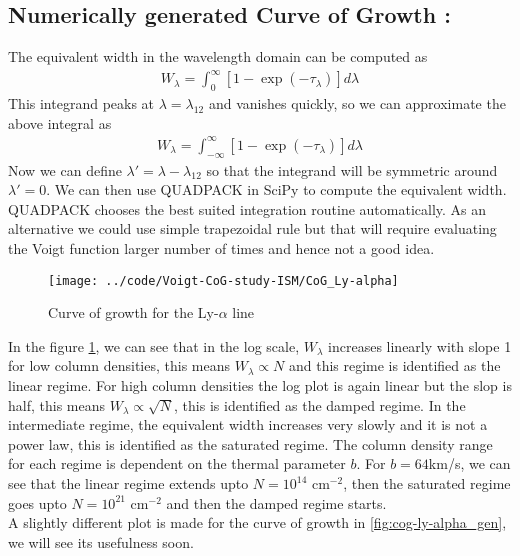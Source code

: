 \documentclass[12pt]{article}
\begin{document}

\subsection{Numerically generated Curve of Growth :}

The equivalent width in the wavelength domain can be computed as
\begin{align}
W_{\lambda} = \int_{0}^{\infty} [1 -\exp (-\tau_{\lambda})] d\lambda
\end{align}
This integrand peaks at $\lambda=\lambda_{12}$ and vanishes quickly, so we can approximate the above integral as
\begin{align}
W_{\lambda} = \int_{-\infty}^{\infty} [1 -\exp (-\tau_{\lambda})] d\lambda
\end{align}
Now we can define $\lambda' = \lambda - \lambda_{12}$ so that the integrand will be symmetric around $\lambda' = 0$. We can then use QUADPACK in SciPy to compute the equivalent width. QUADPACK chooses the best suited integration routine automatically. As an alternative we could use simple trapezoidal rule but that will require evaluating the Voigt function larger number of times and hence not a good idea.

\begin{figure}[H]
\centering
\texttt{[image: ../code/Voigt-CoG-study-ISM/CoG\_Ly-alpha]}
\caption{Curve of growth for the Ly-$\alpha$ line}
\label{fig:cog-ly-alpha}
\end{figure}
In the figure \ref{fig:cog-ly-alpha}, we can see that in the log scale, $W_{\lambda}$ increases linearly with slope 1 for low column densities, this means $W_{\lambda} \propto N$ and this regime is identified as the linear regime. For high column densities the log plot is again linear but the slop is half, this means $W_{\lambda} \propto \sqrt{N}$, this is identified as the damped regime. In the intermediate regime, the equivalent width increases very slowly and it is not a power law, this is identified as the saturated regime. The column density range for each regime is dependent on the thermal parameter $b$. For $b = 64$km/s, we can see that the linear regime extends upto $N=10^{14}$ cm$^{-2}$, then the saturated regime goes upto $N=10^{21}$ cm$^{-2}$ and then the damped regime starts.\\


A slightly different plot is made for the curve of growth in \ref{fig:cog-ly-alpha_gen}, we will see its usefulness soon.
\end{document}
